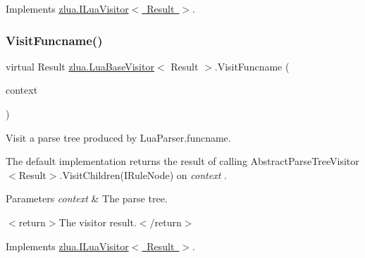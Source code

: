 Implements \mbox{\hyperlink{interfacezlua_1_1_i_lua_visitor_a4362832ba6c73a073512b353b87560d4}{zlua.\+I\+Lua\+Visitor$<$ Result $>$}}.

\mbox{\label{classzlua_1_1_lua_base_visitor_a07e2a1501c3a324becaaa42633bb7dbf}} 
\subsubsection{\texorpdfstring{Visit\+Funcname()}{VisitFuncname()}}
{\footnotesize\ttfamily virtual Result \mbox{\hyperlink{classzlua_1_1_lua_base_visitor}{zlua.\+Lua\+Base\+Visitor}}$<$ Result $>$.Visit\+Funcname (\begin{DoxyParamCaption}\item[{\mbox{[}\+Not\+Null\mbox{]} \mbox{\hyperlink{classzlua_1_1_lua_parser_1_1_funcname_context}{Lua\+Parser.\+Funcname\+Context}}}]{context }\end{DoxyParamCaption})\hspace{0.3cm}{\ttfamily [virtual]}}



Visit a parse tree produced by Lua\+Parser.\+funcname. 

The default implementation returns the result of calling Abstract\+Parse\+Tree\+Visitor$<$\+Result$>$.\+Visit\+Children(\+I\+Rule\+Node) on {\itshape context} . 


\begin{DoxyParams}{Parameters}
{\em context} & The parse tree.\\
\hline
\end{DoxyParams}
$<$return$>$The visitor result.$<$/return$>$ 

Implements \mbox{\hyperlink{interfacezlua_1_1_i_lua_visitor_a125d3084a4d08cdfcea09f917afdf222}{zlua.\+I\+Lua\+Visitor$<$ Result $>$}}.

\mbox{\label{classzlua_1_1_lua_base_visitor_a17082d557201566c36ec9f056b20274d}} 
